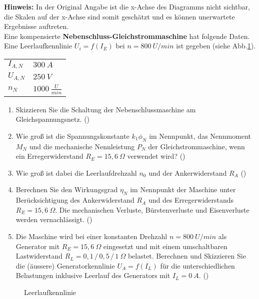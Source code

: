 \begin{question}[section=2,name={14.10.2015},mode=exm,type=bsp,tags={20151014}]
\textbf{Hinweis:} In der Original Angabe ist die x-Achse des Diagramms nicht sichtbar, die Skalen auf der x-Achse sind somit geschätzt und es können unerwartete Ergebnisse auftreten.\\
Eine kompensierte \textbf{Nebenschluss-Gleichstrommaschine} hat folgende Daten. Eine Leerlaufkennlinie $U_i=f(I_E)$ bei $n=800~U/min$ ist gegeben (siehe Abb.\ref{fig:20151014}).\\
\begin{tabular}{L{2cm}l}
$I_{A,N}$ \dotfill &$300~A$\\
$U_{A,N}$ \dotfill & $250~V$ \\
$n_N$ \dotfill & $1000~\frac{U}{min}$
\end{tabular}
\begin{enumerate}
\item Skizzieren Sie die Schaltung der Nebenschlussmaschine am Gleichspannungsnetz. ()
\item Wie groß ist die Spannungskonstante $k_1 \phi_N$ im Nennpunkt, das Nennmoment $M_N$ und die mechanische Nennleistung $P_N$ der Gleichstrommaschine, wenn ein Erregerwiderstand $R_E=15,6~\Omega$ verwendet wird? ()
\item Wie groß ist dabei die Leerlaufdrehzahl $n_0$ und der Ankerwiderstand $R_A$ ()
\item Berechnen Sie den Wirkungsgrad $\eta_N$ im Nennpunkt der Maschine unter Berücksichtigung des Ankerwiderstand $R_A$ und des Erregerwiderstands $R_E = 15,6~\Omega$. Die mechanischen Verluste, Bürstenverluste und Eisenverluste werden vernachlässigt. ()
\item Die Maschine wird bei einer konstanten Drehzahl $n=800~U/min$ als Generator mit $R_E =15,6~\Omega$ eingesetzt und mit einem umschaltbaren Lastwiderstand $R_L = 0,1\, /\, 0,5\, /\, 1 ~\Omega$ belastet. Berechnen und Skizzieren Sie die (äussere) Generatorkennlinie $U_A=f(I_L)$ für die unterschiedlichen Belastungen inklusive Leerlauf des Generators mit $I_L = 0~A$. ()
\end{enumerate}
\begin{figure}[H]
\caption{Leerlaufkennlinie} \label{fig:20151014}
\end{figure}
\end{question}
